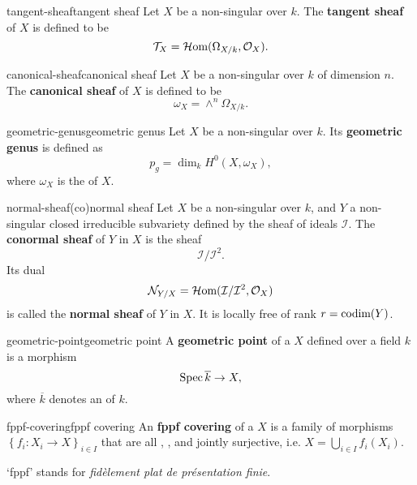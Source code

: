 \begin{topic}{tangent-sheaf}{tangent sheaf}
    Let $X$ be a non-singular  over $k$. The \textbf{tangent sheaf} of $X$ is defined to be
    \[ \mathcal{T}_X = \mathcal{H}\textup{om}(\Omega_{X/k}, \mathcal{O}_X) . \]
\end{topic}

\begin{topic}{canonical-sheaf}{canonical sheaf}
    Let $X$ be a non-singular  over $k$ of dimension $n$. The \textbf{canonical sheaf} of $X$ is defined to be
    \[ \omega_X = \wedge^n \Omega_{X/k} . \]
\end{topic}

\begin{topic}{geometric-genus}{geometric genus}
    Let $X$ be a non-singular  over $k$. Its \textbf{geometric genus} is defined as
    \[ p_g = \dim_k H^0(X, \omega_X) , \]
    where $\omega_X$ is the  of $X$.
\end{topic}

\begin{topic}{normal-sheaf}{(co)normal sheaf}
    Let $X$ be a non-singular  over $k$, and $Y$ a non-singular closed irreducible subvariety defined by the sheaf of ideals $\mathcal{I}$. The \textbf{conormal sheaf} of $Y$ in $X$ is the sheaf
    \[ \mathcal{I}/\mathcal{I}^2 . \]
    Its dual
    \[ \mathcal{N}_{Y/X} = \mathcal{H}\textup{om}(\mathcal{I}/\mathcal{I}^2, \mathcal{O}_X) \]
    is called the \textbf{normal sheaf} of $Y$ in $X$. It is locally free of rank $r = \textup{codim}(Y)$.
\end{topic}

\begin{topic}{geometric-point}{geometric point}
    A \textbf{geometric point} of a  $X$ defined over a field $k$ is a morphism
    \[ \operatorname{Spec} \overline{k} \to X , \]
    where $\overline{k}$ denotes an  of $k$.
\end{topic}

\begin{topic}{fppf-covering}{fppf covering}
    An \textbf{fppf covering} of a  $X$ is a family of morphisms $\left\{ f_i : X_i \to X \right\}_{i \in I}$ that are all , , and jointly surjective, i.e. $X = \bigcup_{i \in I} f_i(X_i)$.
    
    `fppf' stands for \textit{fidèlement plat de présentation finie}.
\end{topic}

